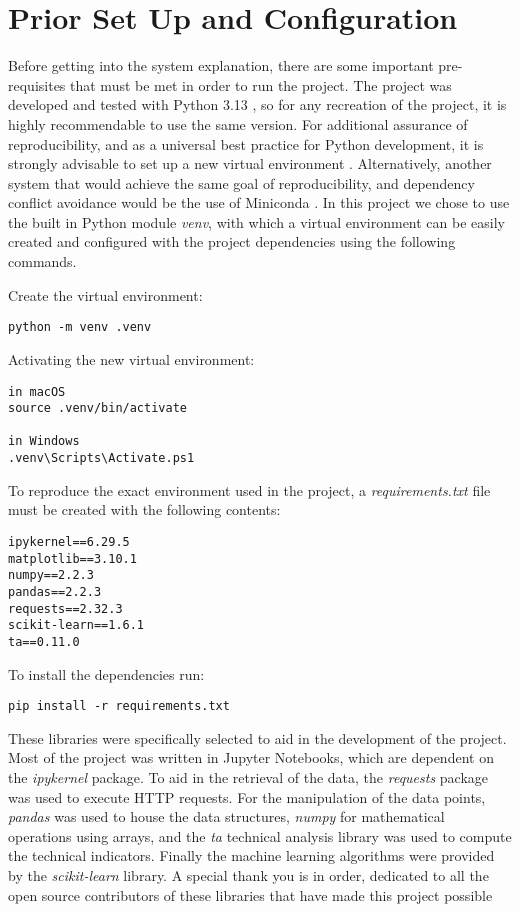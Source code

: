 \documentclass[12pt]{report} %
\begin{document}
\section{Prior Set Up and Configuration}

Before getting into the system explanation, there are some important pre-requisites that must be met in order to run the project. The project was developed and tested with Python 3.13 \cite{python3.13}, so for any recreation of the project, it is highly recommendable to use the same version. For additional assurance of reproducibility, and as a universal best practice for Python development, it is strongly advisable to set up a new virtual environment \cite{python_venv}. Alternatively, another system that would achieve the same goal of reproducibility, and dependency conflict avoidance would be the use of Miniconda \cite{conda}. In this project we chose to use the built in Python module \textit{venv}, with which a virtual environment can be easily created and configured with the project dependencies using the following commands.

\noindent Create the virtual environment:
\begin{verbatim}
python -m venv .venv
\end{verbatim}

\noindent Activating the new virtual environment:
\begin{verbatim}
in macOS
source .venv/bin/activate

in Windows
.venv\Scripts\Activate.ps1
\end{verbatim}

\noindent To reproduce the exact environment used in the project, a \textit{requirements.txt} file must be created with the following contents:
\begin{verbatim}
ipykernel==6.29.5
matplotlib==3.10.1
numpy==2.2.3
pandas==2.2.3
requests==2.32.3
scikit-learn==1.6.1
ta==0.11.0
\end{verbatim}

\noindent To install the dependencies run:
\begin{verbatim}
pip install -r requirements.txt 
\end{verbatim}

These libraries were specifically selected to aid in the development of the project. Most of the project was written in Jupyter Notebooks, which are dependent on the \textit{ipykernel} package. To aid in the retrieval of the data, the \textit{requests} package was used to execute HTTP requests. For the manipulation of the data points, \textit{pandas} was used to house the data structures, \textit{numpy} for mathematical operations using arrays, and the \textit{ta} technical analysis library was used to compute the technical indicators. Finally the machine learning algorithms were provided by the \textit{scikit-learn} library. A special thank you is in order, dedicated to all the open source contributors of these libraries that have made this project possible
\end{document}
